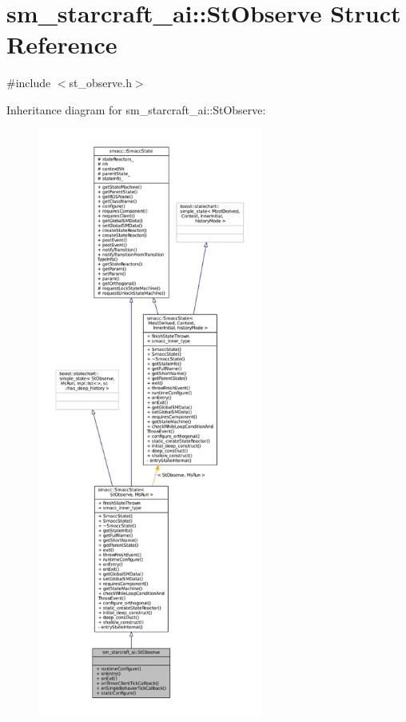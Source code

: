 \hypertarget{structsm__starcraft__ai_1_1StObserve}{}\section{sm\+\_\+starcraft\+\_\+ai\+:\+:St\+Observe Struct Reference}
\label{structsm__starcraft__ai_1_1StObserve}


{\ttfamily \#include $<$st\+\_\+observe.\+h$>$}



Inheritance diagram for sm\+\_\+starcraft\+\_\+ai\+:\+:St\+Observe\+:
\nopagebreak
\begin{figure}[H]
\begin{center}
\leavevmode
\includegraphics[height=550pt]{structsm__starcraft__ai_1_1StObserve__inherit__graph}
\end{center}
\end{figure}


